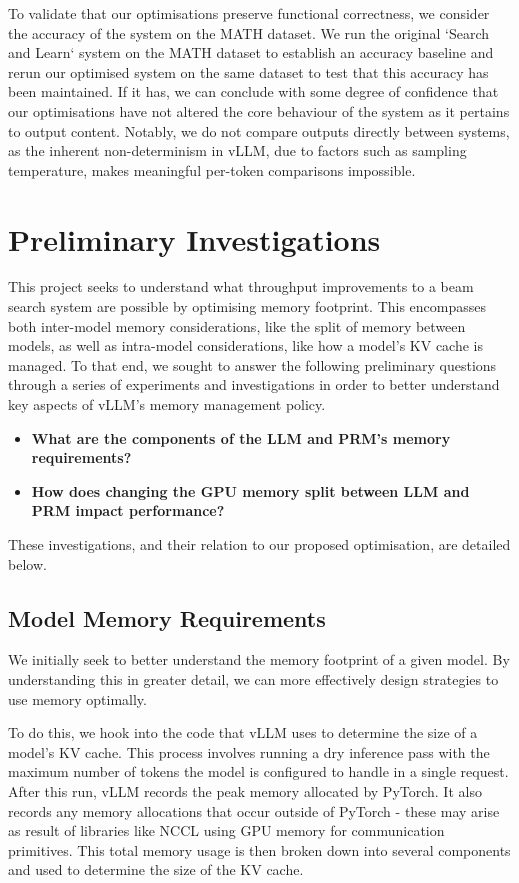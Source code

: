 \documentclass[11pt,twoside]{report}
\begin{document}
To validate that our optimisations preserve functional correctness, we consider the accuracy of the system on the MATH dataset. 
We run the original `Search and Learn` system on the MATH dataset to establish an accuracy baseline and rerun our optimised system on the same dataset to test that this accuracy has been maintained.
If it has, we can conclude with some degree of confidence that our optimisations have not altered the core behaviour of the system as it pertains to output content.
Notably, we do not compare outputs directly between systems, as the inherent non-determinism in vLLM, due to factors such as sampling temperature, makes meaningful per-token comparisons impossible.

\chapter{Preliminary Investigations}
This project seeks to understand what throughput improvements to a beam search system are possible by optimising memory footprint.
This encompasses both inter-model memory considerations, like the split of memory between models, as well as intra-model considerations, like how a model's KV cache is managed.
To that end, we sought to answer the following preliminary questions through a series of experiments and investigations in order to better understand key aspects of vLLM's memory management policy.
\begin{itemize}
    \item \textbf{What are the components of the LLM and PRM's memory requirements?}
    \item \textbf{How does changing the GPU memory split between LLM and PRM impact performance?}
\end{itemize}
These investigations, and their relation to our proposed optimisation, are detailed below.

\section{Model Memory Requirements}
We initially seek to better understand the memory footprint of a given model.
By understanding this in greater detail, we can more effectively design strategies to use memory optimally.

To do this, we hook into the code that vLLM uses to determine the size of a model's KV cache.
This process involves running a dry inference pass with the maximum number of tokens the model is configured to handle in a single request.
After this run, vLLM records the peak memory allocated by PyTorch.
It also records any memory allocations that occur outside of PyTorch - these may arise as result of libraries like NCCL using GPU memory for communication primitives.
This total memory usage is then broken down into several components and used to determine the size of the KV cache.
\end{document}
